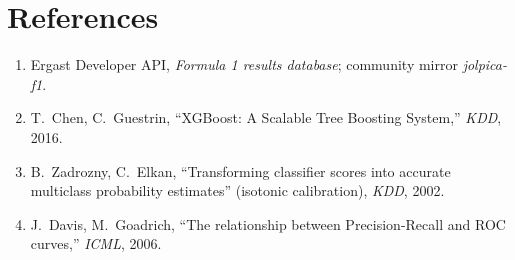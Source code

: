 \documentclass[10pt,twocolumn]{article}
\begin{document}
\section{References}
\begin{enumerate}[leftmargin=1.6em,itemsep=1pt]
  \item Ergast Developer API, \textit{Formula 1 results database}; community
        mirror \textit{jolpica-f1}.
  \item T.~Chen, C.~Guestrin, ``XGBoost: A Scalable Tree Boosting System,''
        \textit{KDD}, 2016.
  \item B.~Zadrozny, C.~Elkan, ``Transforming classifier scores into accurate
        multiclass probability estimates'' (isotonic calibration), \textit{KDD},
        2002.
  \item J.~Davis, M.~Goadrich, ``The relationship between Precision-Recall and
        ROC curves,'' \textit{ICML}, 2006.
\end{enumerate}
\end{document}
